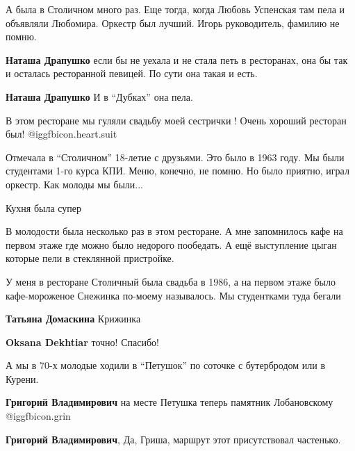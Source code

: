 \begin{itemize}
А была в Столичном много раз. Еще тогда, когда Любовь Успенская там пела и
объявляли Любомира. Оркестр был лучший. Игорь руководитель, фамилию не помню.


\textbf{Наташа Драпушко} если бы не уехала и не стала петь в ресторанах, она бы так и осталась ресторанной певицей. По сути она такая и есть.

\textbf{Наташа Драпушко} И в \enquote{Дубках} она пела.

В этом ресторане мы гуляли свадьбу моей сестрички ! Очень хороший ресторан был! @igg{fbicon.heart.suit}


Отмечала в \enquote{Столичном} 18-летие с друзьями. Это было в 1963 году. Мы были
студентами 1-го курса КПИ. Меню, конечно, не помню. Но было приятно, играл
оркестр. Как молоды мы были...

Кухня была супер


В молодости была несколько раз в этом ресторане. А мне запомнилось кафе на
первом этаже где можно было недорого пообедать. А ещё выступление цыган которые
пели в стеклянной пристройке.


У меня в ресторане Столичный была свадьба в 1986, а на первом этаже было
кафе-мороженое Снежинка по-моему называлось. Мы студентками туда бегали

\begin{itemize} %
\textbf{Татьяна Домаскина} Крижинка

\textbf{Oksana Dekhtiar} точно! Спасибо!
\end{itemize} %


А мы в 70-х молодые ходили в \enquote{Петушок} по соточке с бутербродом или в
Курени.

\begin{itemize} %
\textbf{Григорий Владимирович} на месте Петушка теперь памятник Лобановскому @igg{fbicon.grin} 

\textbf{Григорий Владимирович}, Да, Гриша, маршрут этот присутствовал частенько.
\end{itemize} %


\end{itemize} %
